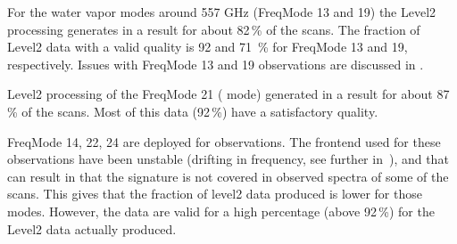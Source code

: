 % 

For the water vapor modes around 557 GHz (FreqMode
13 and 19) the Level2 processing generates in a result for
about 82\,\% of the scans. The fraction of Level2 
data with a valid quality is 92 and 71 \,\% for FreqMode
13 and 19, respectively.
Issues with FreqMode 13 and 19 observations are discussed
in \cite{pver}.
 
Level2 processing of the FreqMode 21 ( mode)
generated in a result for about 87\,\% of the scans.
Most of this data (92\,\%) have a satisfactory quality.

FreqMode 14, 22, 24 are deployed for  observations.
The frontend used for these observations have been unstable
(drifting in frequency, see further in~\citet{grieco:recov:20}),
and that can result in that the 
 signature is not covered in observed spectra 
of some of the scans. This gives that the fraction of
level2 data produced is lower for those modes.
However, the data are valid for a high percentage
(above 92\,\%) for the Level2 data actually produced.  
 


